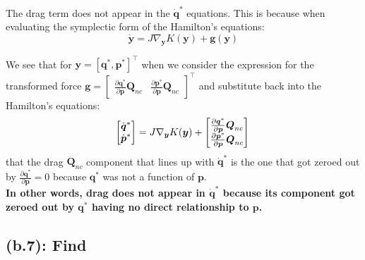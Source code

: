 \documentclass[titlepage]{article}
\begin{document}
\newpage

\begin{mdframed}[linewidth=1pt, innertopmargin=10pt, innerbottommargin=10pt]
	The drag term does not appear in the $\dot{\boldsymbol{q}}^*$ equations. This is because when evaluating the symplectic form of the Hamilton's equations:
	\begin{equation}
		\dot{\boldsymbol{y}}=J\nabla_{\boldsymbol{y}}K(\boldsymbol{y})+\boldsymbol{g}(\boldsymbol{y})
	\end{equation}
	
	We see that for $\boldsymbol{y}=[\boldsymbol{q}^*,\boldsymbol{p}^*]^\top$ when we consider the expression for the transformed force $\boldsymbol{g}=\begin{bmatrix}\frac{\partial\boldsymbol{q}^*}{\partial\boldsymbol{p}}\boldsymbol{Q}_{nc} &\frac{\partial\boldsymbol{p}^*}{\partial\boldsymbol{p}}\boldsymbol{Q}_{nc}\end{bmatrix}^\top$ and substitute back into the Hamilton's equations:
	\begin{equation}
		\begin{bmatrix}
			\dot{\boldsymbol{q}}^* \\
			\dot{\boldsymbol{p}}^* \\
		\end{bmatrix}=
		J\nabla_{\boldsymbol{y}}K(\boldsymbol{y})+
		\begin{bmatrix}
			\frac{\partial\boldsymbol{q}^*}{\partial\boldsymbol{p}}\boldsymbol{Q}_{nc} \\
			\frac{\partial\boldsymbol{p}^*}{\partial\boldsymbol{p}}\boldsymbol{Q}_{nc}
		\end{bmatrix} \\
	\end{equation}
	that the drag $\boldsymbol{Q}_{nc}$ component that lines up with $\dot{\boldsymbol{q}}^*$ is the one that got zeroed out by $\frac{\partial\boldsymbol{q}^*}{\partial\boldsymbol{p}}=0$ because $\boldsymbol{q}^*$ was not a function of $\boldsymbol{p}$. \\
	
	\textbf{In other words, drag does not appear in $\dot{\boldsymbol{q}}^*$ because its component got zeroed out by $\boldsymbol{q}^*$ having no direct relationship to $\boldsymbol{p}$.}
\end{mdframed}

\subsection*{(b.7): Find}
\end{document}
